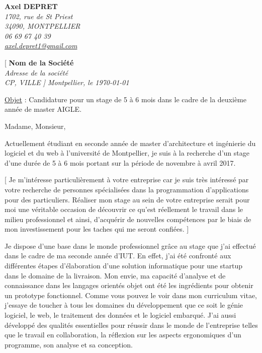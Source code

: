 \documentclass[11pt]{letter}
\begin{document}
 \sffamily
 \hfill

 \begin{flushleft}
 {\bfseries Axel DEPRET}\\[.35ex]
 \small\itshape
 1702, rue de St Priest\\
 34090, MONTPELLIER\\[.35ex]
 06 69 67 40 39\\
 \href{mailto:axel.depret1@gmail.com}{axel.depret1@gmail.com} 
 \end{flushleft}

 \begin{flushright}
 {[ \bfseries Nom de la Société}\\[.35ex]
 \small\itshape
 Adresse de la société\\
 CP, VILLE ]
 \vskip 0.1cm
 Montpellier, le \today \\
 \end{flushright}

 \vskip 1cm

\begin{flushleft}
\underline{Objet} : Candidature pour un stage de 5 à 6 mois dans le cadre de la deuxième année de master AIGLE.
\end{flushleft}

 \vskip 0.5cm

Madame, Monsieur,\par

Actuellement étudiant en seconde année de master d'architecture et ingénierie du logiciel et du web à l'université de Montpellier, je suis à la recherche d'un stage d'une durée de 5 à 6 mois portant sur la période de novembre à avril 2017.\par

[ Je m'intéresse particulièrement à votre entreprise car je suis très intéressé par votre recherche
de personnes spécialisées dans la programmation d'applications pour des particuliers. Réaliser mon
stage au sein de votre entreprise serait pour moi une véritable occasion de découvrir ce qu'est
réellement le travail dans le milieu professionnel et ainsi, d’acquérir de nouvelles compétences par
le biais de mon investissement pour les taches qui me seront confiées. ]\par


Je dispose d'une base dans le monde professionnel grâce au stage que j'ai effectué dans le cadre de ma seconde année d'IUT. En effet, j'ai été confronté
aux différentes étapes d'élaboration d'une solution informatique pour une startup dans le domaine de la livraison. Mon envie, ma capacité d'analyse et de connaissance dans les langages orientés
objet ont été les ingrédients pour obtenir un prototype fonctionnel.
Comme vous pouvez le voir dans mon curriculum vitae, j'essaye de toucher à tous les domaines du développement que ce soit le génie logiciel, le web, le traitement des données et le logiciel embarqué.
J'ai aussi développé des qualités essentielles pour réussir dans le monde de l'entreprise telles que le travail en collaboration, la réflexion sur les aspects ergonomiques d'un programme, son analyse et sa conception. \par
\end{document}

